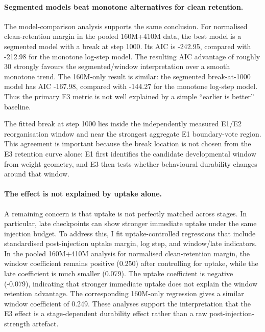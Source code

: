 \paragraph{Segmented models beat monotone alternatives for clean retention.}
The model-comparison analysis supports the same conclusion.  For normalised clean-retention margin in the pooled 160M+410M data, the best model is a segmented model with a break at step 1000.  Its AIC is -242.95, compared with -212.98 for the monotone log-step model.  The resulting AIC advantage of roughly 30 strongly favours the segmented/window interpretation over a smooth monotone trend.  The 160M-only result is similar: the segmented break-at-1000 model has AIC -167.98, compared with -144.27 for the monotone log-step model.  Thus the primary E3 metric is not well explained by a simple ``earlier is better'' baseline.

The fitted break at step 1000 lies inside the independently measured E1/E2 reorganisation window and near the strongest aggregate E1 boundary-vote region.  This agreement is important because the break location is not chosen from the E3 retention curve alone: E1 first identifies the candidate developmental window from weight geometry, and E3 then tests whether behavioural durability changes around that window.

\paragraph{The effect is not explained by uptake alone.}
A remaining concern is that uptake is not perfectly matched across stages.  In particular, late checkpoints can show stronger immediate uptake under the same injection budget.  To address this, I fit uptake-controlled regressions that include standardised post-injection uptake margin, log step, and window/late indicators.  In the pooled 160M+410M analysis for normalised clean-retention margin, the window coefficient remains positive (0.250) after controlling for uptake, while the late coefficient is much smaller (0.079).  The uptake coefficient is negative (-0.079), indicating that stronger immediate uptake does not explain the window retention advantage.  The corresponding 160M-only regression gives a similar window coefficient of 0.249.  These analyses support the interpretation that the E3 effect is a stage-dependent durability effect rather than a raw post-injection-strength artefact.

